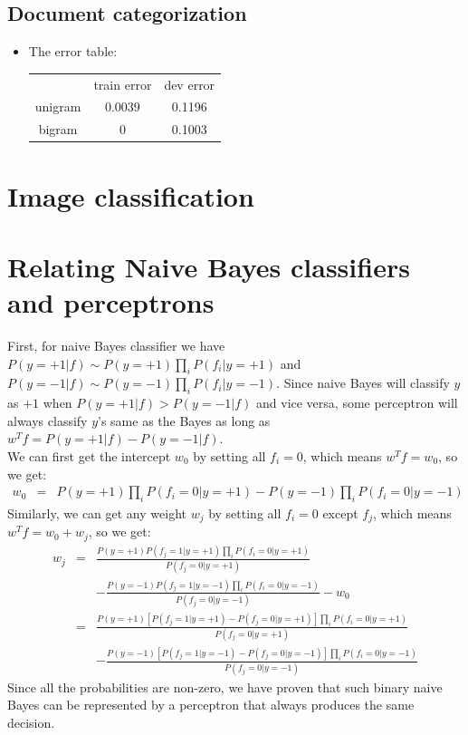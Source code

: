 \documentclass[11pt]{article}
\begin{document}
\begin{onehalfspace}
	\subsection*{Document categorization}
	\begin{itemize}
		\item
		The error table:\\
		\begin{tabular}{c | c | c}
		& train error & dev error\\
		unigram & 0.0039 & 0.1196\\
		bigram & 0 & 0.1003\\
		\end{tabular}
	\end{itemize}
\section*{Image classification}
\section*{Relating Naive Bayes classifiers and perceptrons}
First, for naive Bayes classifier we have $P(y = +1|f) \sim P(y=+1)\prod_iP(f_i|y=+1)$ and $P(y = -1|f) \sim P(y=-1)\prod_iP(f_i|y=-1)$. Since naive Bayes will classify $y$ as $+1$ when $P(y = +1|f) > P(y = -1|f)$ and vice versa, some perceptron will always classify $y$'s same as the Bayes as long as $w^Tf = P(y = +1|f) - P(y = -1|f)$.\\
We can first get the intercept $w_0$ by setting all $f_i = 0$, which means $w^Tf = w_0$, so we get:\\
\begin{eqnarray*}
w_0 &=& P(y=+1)\prod_iP(f_i=0|y=+1) - P(y=-1)\prod_iP(f_i=0|y=-1)
\end{eqnarray*}
Similarly, we can get any weight $w_j$ by setting all $f_i = 0$ except $f_j$, which means $w^Tf = w_0+w_j$, so we get:\\
\begin{eqnarray*}
w_j &=& \frac{P(y=+1)P(f_j=1|y=+1)\prod_iP(f_i=0|y=+1)}{P(f_j=0|y=+1)}\\
	&&-\frac{P(y=-1)P(f_j=1|y=-1)\prod_iP(f_i=0|y=-1)}{P(f_j=0|y=-1)}-w_0\\
	&=& \frac{P(y=+1)[P(f_j=1|y=+1)-P(f_j=0|y=+1)]\prod_iP(f_i=0|y=+1)}{P(f_j=0|y=+1)}\\
	&&-\frac{P(y=-1)[P(f_j=1|y=-1)-P(f_j=0|y=-1)]\prod_iP(f_i=0|y=-1)}{P(f_j=0|y=-1)}
\end{eqnarray*}
Since all the probabilities are non-zero, we have proven that such binary naive Bayes can be represented by a perceptron that always produces the same decision.
\end{onehalfspace}
\end{document}
